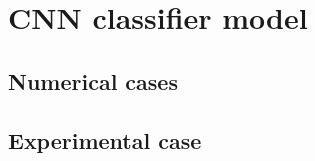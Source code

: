 \section{CNN classifier model}
\label{sec51}


\lipsum[1]

\subsection{Numerical cases}
\label{sec511}

\lipsum[1]

\subsection{Experimental case}
\label{sec512}

\lipsum[1]
